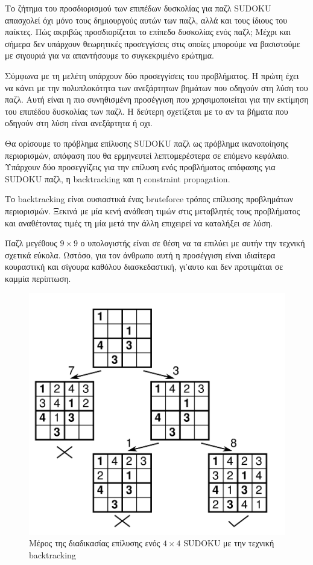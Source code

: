 \documentclass[12pt]{book}
\theoremstyle{definition}
\begin{document}
Το ζήτημα του προσδιορισμού των επιπέδων δυσκολίας για παζλ SUDOKU απασχολεί όχι μόνο τους δημιουργούς αυτών των παζλ, αλλά και τους ίδιους του παίκτες. Πώς ακριβώς προσδιορίζεται το επίπεδο δυσκολίας ενός παζλ; Μέχρι και σήμερα δεν υπάρχουν θεωρητικές προσεγγίσεις στις οποίες μπορούμε να βασιστούμε με σιγουριά για να απαντήσουμε το συγκεκριμένο ερώτημα. \par 

Σύμφωνα με τη μελέτη \cite{5} υπάρχουν δύο προσεγγίσεις του προβλήματος. Η πρώτη έχει να κάνει με την πολυπλοκότητα των ανεξάρτητων βημάτων που οδηγούν στη λύση του παζλ. Αυτή είναι η πιο συνηθισμένη προσέγγιση που χρησιμοποιείται για την εκτίμηση του επιπέδου δυσκολίας των παζλ. Η δεύτερη σχετίζεται με το αν τα βήματα που οδηγούν στη λύση είναι ανεξάρτητα ή οχι. \par

Θα ορίσουμε το πρόβλημα επίλυσης SUDOKU παζλ ως πρόβλημα ικανοποίησης περιορισμών, απόφαση που θα ερμηνευτεί λεπτομερέστερα σε επόμενο κεφάλαιο. Υπάρχουν δύο προσεγγίζεις για την επίλυση ενός προβλήματος απόφασης για SUDOKU παζλ, η backtracking και η constraint propagation. \par

Το backtracking είναι ουσιαστικά ένας bruteforce τρόπος επίλυσης προβλημάτων περιορισμών. Ξεκινά με μία κενή ανάθεση τιμών στις μεταβλητές τους προβλήματος και αναθέτοντας τιμές τη μία μετά την άλλη επιχειρεί να καταλήξει σε λύση. \par

Παζλ μεγέθους \(9 \times 9\) ο υπολογιστής είναι σε θέση να τα επιλύει με αυτήν την τεχνική σχετικά εύκολα. Ωστόσο, για τον άνθρωπο αυτή η προσέγγιση είναι ιδιαίτερα κουραστική και σίγουρα καθόλου διασκεδαστική, γι'αυτο και δεν προτιμάται σε καμμία περίπτωση. \par

\begin{figure}[h]
	\centering	
	\includegraphics[scale=0.45]{Figures/backtracking.png}
	\caption{Μέρος της διαδικασίας επίλυσης ενός \(4 \times 4\) SUDOKU με την τεχνική backtracking}
\end{figure}
\end{document}
